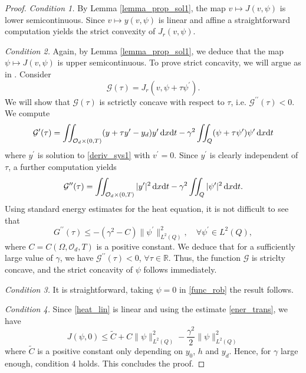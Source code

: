 \documentclass[preprint,10pt]{article}
\numberwithin{equation}{section}
\numberwithin{theorem}{section}
\def\dx{\,\textnormal{d}x}
\def\dt{\textnormal{d}t}
\def\dx{\,\textnormal{d}x}
\def\dt{\textnormal{d}t}
\begin{document}
{\begin{proof}
\textit{Condition 1.} By Lemma \ref{lemma_prop_sol1}, the map $v\mapsto J(v,\psi)$ is lower semicontinuous. Since $v\mapsto y(v,\psi)$ is linear and affine a straightforward computation yields the strict convexity of $J_r(v,\psi)$. 

\smallskip\noindent
\textit{Condition 2.} Again, by Lemma \ref{lemma_prop_sol1}, we deduce that the map $\psi\mapsto J(v,\psi)$ is upper semicontinuous. To prove strict concavity, we will argue as in \cite{temam_nonlinear}. Consider
%
\begin{equation*}
\mathcal{G}(\tau)=J_r(v,\psi+\tau \psi^\prime).
\end{equation*}
%
We will show that $\mathcal G(\tau)$ is sctrictly concave with respect to $\tau$, i.e. $\mathcal G^{\prime\prime}(\tau)<0$. We compute
%
\begin{equation*}
\mathcal G^\prime(\tau)=\iint_{\mathcal O_d\times(0,T)}(y+\tau y^\prime-y_d)y^\prime\dx\dt-\gamma^2\iint_{Q}(\psi+\tau\psi^\prime)\psi^\prime\dx\dt
\end{equation*}
%
where $y^\prime$ is solution to \eqref{deriv_sys1} with $v^\prime=0$. Since $y^\prime$ is clearly independent of $\tau$, a further computation yields
%
\begin{equation*}
\mathcal G^{\prime\prime}(\tau)=\iint_{\mathcal O_d\times(0,T)}|y^\prime|^2\dx\dt-\gamma^2\iint_{Q}|\psi^\prime|^2\dx\dt.
\end{equation*}
%
Using standard energy estimates for the heat equation, it is not difficult to see that 
%
\begin{equation*}
G^{\prime\prime}(\tau)\leq -(\gamma^2-C)\|\psi^\prime\|^2_{L^2(Q)}, \quad \forall \psi^\prime\in L^2(Q),
\end{equation*}
%
where $C=C(\Omega,\mathcal O_d,T)$ is a positive constant. We deduce that for a sufficiently large value of $\gamma$, we have $\mathcal G^{\prime\prime}(\tau)<0$, $\forall \tau\in \mathbb{R}$. Thus, the function $\mathcal G$ is striclty concave, and the strict concavity of $\psi$ follows immediately. 

\smallskip\noindent
\textit{Condition 3.} It is straightforward, taking $\psi=0$ in \eqref{func_rob} the result follows. 

\smallskip\noindent
\textit{Condition 4.} Since \eqref{heat_lin} is linear and using the estimate \eqref{ener_trans}, we have
%
\begin{equation*}
J(\psi,0)\leq \tilde C+C\|\psi\|_{L^2(Q)}^2-\frac{\gamma^2}{2}\|\psi\|_{L^2(Q)}^2
\end{equation*}
%
where $\tilde C$ is a positive constant only depending on $y_0$, $h$ and $y_d$. Hence, for $\gamma$ large enough, condition 4 holds. This concludes the proof.
%
\end{proof}

}
\end{document}
